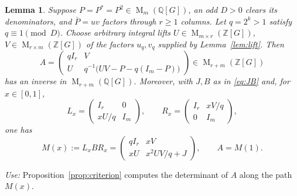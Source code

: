 \documentclass[11pt]{article}
\newtheorem{lemma}[theorem]{Lemma}
\theoremstyle{remark}
\numberwithin{equation}{section}
\newcommand{\Z}{\mathbb Z}
\newcommand{\Q}{\mathbb Q}
\newcommand{\Mat}{\operatorname{M}}
\begin{document}
\begin{lemma}\label{lem:integral}
Suppose $P=P^*=P^2\in\Mat_m(\Q[G])$, an odd $D>0$ clears its
denominators, and $\bar P=uv$ factors through $r\ge1$ columns.
Let $q=2^k>1$ satisfy $q\equiv1\pmod D$. Choose arbitrary
integral lifts $U\in\Mat_{m\times r}(\Z[G])$, $V\in\Mat_{r\times m}(\Z[G])$ of the factors $u_q,v_q$ supplied by Lemma~\ref{lem:lift}.
Then
\begin{equation}\label{eq:integral-matrix}
 A=\begin{pmatrix}
 qI_r&V\\
 U&q^{-1}\bigl(UV-P-q(I_m-P)\bigr)
 \end{pmatrix}
 \in\Mat_{r+m}(\Z[G])
\end{equation}
has an inverse in $\Mat_{r+m}(\Q[G])$. Moreover, with $J,B$ as in \eqref{eq:JB} and, for $x\in[0,1]$,
\[
 L_x=\begin{pmatrix}I_r&0\\xU/q&I_m\end{pmatrix},\qquad
 R_x=\begin{pmatrix}I_r&xV/q\\0&I_m\end{pmatrix},
\]
one has
\begin{equation}\label{eq:path}
 M(x):=L_xBR_x=
 \begin{pmatrix}qI_r&xV\\xU&x^2UV/q+J\end{pmatrix},\qquad A=M(1).
\end{equation}
\end{lemma}

\emph{Use:} Proposition~\ref{prop:criterion} computes the determinant of $A$ along the path $M(x)$.
\end{document}
